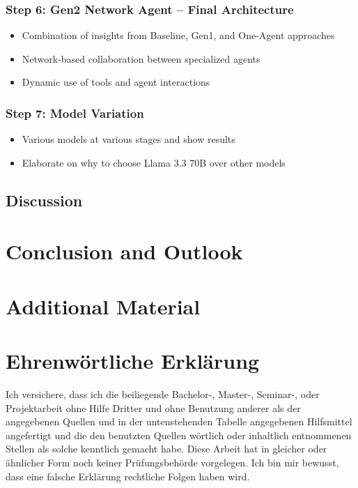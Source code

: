 \documentclass[a4paper,oneside,bibliography=totoc]{scrbook}
\begin{document}
\subsection{Step 6: Gen2 Network Agent – Final Architecture}
\begin{itemize}
  \item Combination of insights from Baseline, Gen1, and One-Agent approaches
  \item Network-based collaboration between specialized agents
  \item Dynamic use of tools and agent interactions
\end{itemize}

\subsection{Step 7: Model Variation}
\begin{itemize}
  \item Various models at various stages and show results
  \item Elaborate on why to choose Llama 3.3 70B over other models
\end{itemize}

\section{Discussion}


\chapter{Conclusion and Outlook}




\appendix
\chapter{Additional Material}


\backmatter
\chapter{Ehrenwörtliche Erklärung}

Ich versichere, dass ich die beiliegende Bachelor-, Master-, Seminar-, oder
Projektarbeit ohne Hilfe Dritter und ohne Benutzung anderer als der angegebenen
Quellen und in der untenstehenden Tabelle angegebenen Hilfsmittel angefertigt
und die den benutzten Quellen wörtlich oder inhaltlich entnommenen Stellen als
solche kenntlich gemacht habe. Diese Arbeit hat in gleicher oder ähnlicher Form
noch keiner Prüfungsbehörde vorgelegen. Ich bin mir bewusst, dass eine falsche
Erklärung rechtliche Folgen haben wird.
\end{document}
